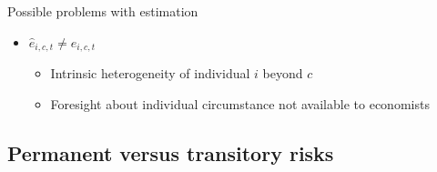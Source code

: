 \documentclass{beamer}
\begin{document}

\begin{frame}{Possible problems with estimation}
	\begin{itemize}
		\item $\hat e_{i,c,t} \neq e_{i,c,t}$
		\begin{itemize}
			\item Intrinsic heterogeneity of individual $i$ beyond $c$
			\item Foresight about individual circumstance not available to economists
		\end{itemize}
	\end{itemize}	
\end{frame}



\subsection{Permanent  versus transitory risks}
\end{document}
